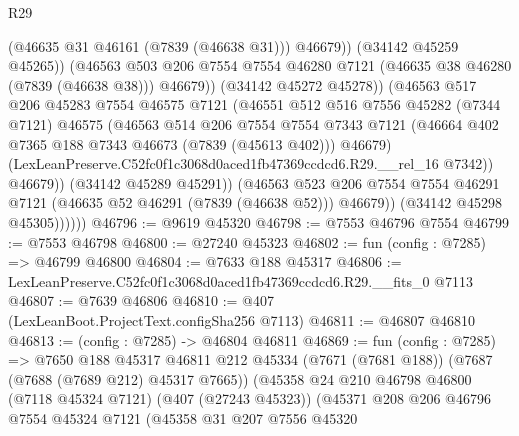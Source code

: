 \begin{lexlean}{R29}
\begin{coremodule}
                              (@46635 @31 @46161 (@7839 (@46638 @31)))
                              @46679))
                          (@34142 @45259 @45265))
                        (@46563
                          @503
                          @206
                          @7554
                          @7554
                          @46280
                          @7121
                          (@46635 @38 @46280 (@7839 (@46638 @38)))
                          @46679))
                      (@34142 @45272 @45278))
                    (@46563
                      @517
                      @206
                      @45283
                      @7554
                      @46575
                      @7121
                      (@46551
                        @512
                        @516
                        @7556
                        @45282
                        (@7344 @7121)
                        @46575
                        (@46563
                          @514
                          @206
                          @7554
                          @7554
                          @7343
                          @7121
                          (@46664 @402 @7365 @188 @7343 @46673 (@7839 (@45613 @402)))
                          @46679)
                        (LexLeanPreserve.C52fc0f1c3068d0aced1fb47369ccdcd6.R29.__rel_16 @7342))
                      @46679))
                  (@34142 @45289 @45291))
                (@46563
                  @523
                  @206
                  @7554
                  @7554
                  @46291
                  @7121
                  (@46635 @52 @46291 (@7839 (@46638 @52)))
                  @46679))
              (@34142 @45298 @45305))))))
@46796 := @9619 @45320
@46798 := @7553 @46796 @7554
@46799 := @7553 @46798
@46800 := @27240 @45323
@46802 := fun (config : @7285) => @46799 @46800
@46804 := @7633 @188 @45317
@46806 := LexLeanPreserve.C52fc0f1c3068d0aced1fb47369ccdcd6.R29.__fits_0 @7113
@46807 := @7639 @46806
@46810 := @407 (LexLeanBoot.ProjectText.configSha256 @7113)
@46811 := @46807 @46810
@46813 := (config : @7285) -> @46804 @46811
@46869 := fun (config : @7285) =>
  @7650
    @188
    @45317
    @46811
    @212
    @45334
    (@7671 (@7681 @188))
    (@7687 (@7688 (@7689 @212) @45317 @7665))
    (@45358
      @24
      @210
      @46798
      @46800
      (@7118 @45324 @7121)
      (@407 (@27243 @45323))
      (@45371
        @208
        @206
        @46796
        @7554
        @45324
        @7121
        (@45358
          @31
          @207
          @7556
          @45320

\end{coremodule}
\end{lexlean}
